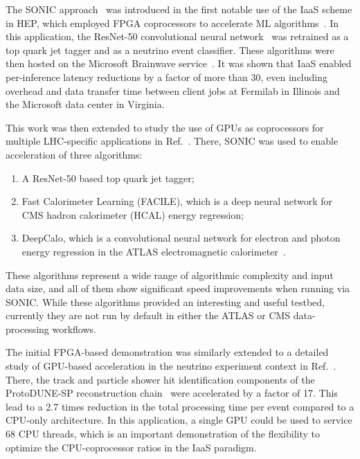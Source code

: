 
The SONIC approach~\cite{SONIC_origin, SONIC_cms} was introduced in the first notable use of the IaaS scheme in HEP, which employed FPGA coprocessors to accelerate ML algorithms~\cite{Duarte:2019fta}. In this application, the ResNet-50 convolutional neural network~\cite{ResNet50} was retrained as a top quark jet tagger and as a neutrino event classifier. These algorithms were then hosted on the Microsoft Brainwave service~\cite{Brainwave}. It was shown that IaaS enabled per-inference latency reductions by a factor of more than 30, even including overhead and data transfer time between client jobs at Fermilab in Illinois and the Microsoft data center in Virginia.

This work was then extended to study the use of GPUs as coprocessors for multiple LHC-specific applications in Ref.~\cite{Krupa:2020bwg}. There, SONIC was used to enable acceleration of three algorithms:
\begin{enumerate}
    \item A ResNet-50 based top quark jet tagger;
    \item Fast Calorimeter Learning (FACILE), which is a deep neural network for CMS hadron calorimeter (HCAL) energy regression;
    \item DeepCalo, which is a convolutional neural network for electron and photon energy regression in the ATLAS electromagnetic calorimeter~\cite{deepcalo}.
\end{enumerate}
These algorithms represent a wide range of algorithmic complexity and input data size, and all of them show significant speed improvements when running via SONIC. While these algorithms provided an interesting and useful testbed, currently they are not run by default in either the ATLAS or CMS data-processing workflows.

The initial FPGA-based demonstration was similarly extended to a detailed study of GPU-based acceleration in the neutrino experiment context in Ref.~\cite{Wang:2020fjr}. There, the track and particle shower hit identification components of the ProtoDUNE-SP reconstruction chain~\cite{DUNE:2020cqd} were accelerated by a factor of 17. This lead to a 2.7 times reduction in the total processing time per event compared to a CPU-only architecture. In this application, a single GPU could be used to service 68 CPU threads, which is an important demonstration of the flexibility to optimize the CPU-coprocessor ratios in the IaaS paradigm.

